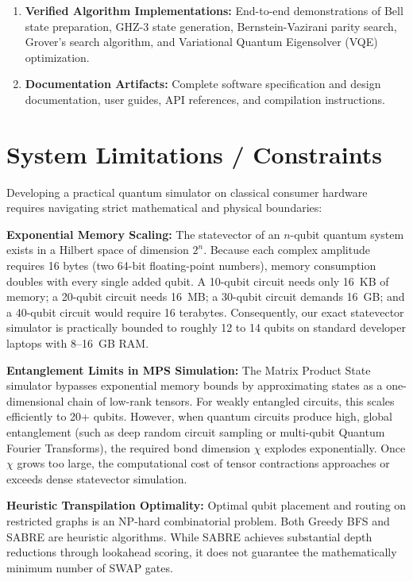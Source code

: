 \begin{enumerate}[leftmargin=*]
    \item \textbf{Verified Algorithm Implementations:} End-to-end demonstrations of Bell state preparation, GHZ-3 state generation, Bernstein-Vazirani parity search, Grover's search algorithm, and Variational Quantum Eigensolver (VQE) optimization.
    \item \textbf{Documentation Artifacts:} Complete software specification and design documentation, user guides, API references, and compilation instructions.
\end{enumerate}


\section{System Limitations / Constraints}

Developing a practical quantum simulator on classical consumer hardware requires navigating strict mathematical and physical boundaries:

\textbf{Exponential Memory Scaling:} The statevector of an $n$-qubit quantum system exists in a Hilbert space of dimension $2^n$. Because each complex amplitude requires 16 bytes (two 64-bit floating-point numbers), memory consumption doubles with every single added qubit. A 10-qubit circuit needs only 16~KB of memory; a 20-qubit circuit needs 16~MB; a 30-qubit circuit demands 16~GB; and a 40-qubit circuit would require 16 terabytes. Consequently, our exact statevector simulator is practically bounded to roughly 12 to 14 qubits on standard developer laptops with 8--16~GB RAM.

\textbf{Entanglement Limits in MPS Simulation:} The Matrix Product State simulator bypasses exponential memory bounds by approximating states as a one-dimensional chain of low-rank tensors. For weakly entangled circuits, this scales efficiently to 20+ qubits. However, when quantum circuits produce high, global entanglement (such as deep random circuit sampling or multi-qubit Quantum Fourier Transforms), the required bond dimension $\chi$ explodes exponentially. Once $\chi$ grows too large, the computational cost of tensor contractions approaches or exceeds dense statevector simulation.

\textbf{Heuristic Transpilation Optimality:} Optimal qubit placement and routing on restricted graphs is an NP-hard combinatorial problem. Both Greedy BFS and SABRE are heuristic algorithms. While SABRE achieves substantial depth reductions through lookahead scoring, it does not guarantee the mathematically minimum number of SWAP gates.

